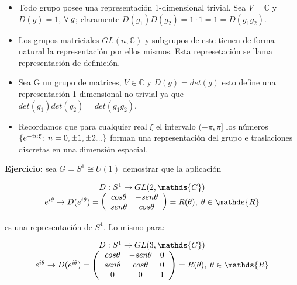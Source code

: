 \documentclass{article}
\begin{document}
\begin{itemize}
\item Todo grupo posee una representación 1-dimensional trivial. Sea $V=\mathds{C}$ y $D(g)=1$, $\forall \hspace{0.1cm} g$; claramente $D(g_1)D(g_2)=1\cdot 1=1=D(g_1g_2)$.
\item Los grupos matriciales $GL(n,\mathds{C})$ y subgrupos de este tienen de forma natural la representación por ellos mismos. Esta represetación se llama representación de definición.
\item Sea G un grupo de matrices, $V\in \mathds{C}$ y $D(g)=det(g)$ esto define una representación 1-dimensional no trivial ya que $det(g_1)det(g_2)=det(g_1g_2)$.
\item Recordamos que para cualquier real $\xi$ el intervalo $(-\pi, \pi]$ los números $\lbrace e^{-in\xi}; \hspace{0.1cm} n=0,\pm 1, \pm 2... \rbrace$ forman una representación del grupo e traslaciones discretas en una dimensión espacial.
\end{itemize}

\smallskip
\textbf{Ejercicio:} sea $G=S^1 \cong U(1)$ demostrar que la aplicación

$$\begin{array}{cc}
D: S^1 \to GL(2,\mathds{C})  \\
e^{i\theta} \to D(e^{i\theta})= \left (\begin{array}{cc}
cos \theta   & -sen \theta  \\
sen \theta   & cos \theta
\end{array} \right )=R( \theta), \hspace{0.1cm} \theta \in \mathds{R}
\end{array}$$

es una representación de $S^1$. Lo mismo para:

$$\begin{array}{cc}
D: S^1 \to GL(3,\mathds{C})  \\
e^{i\theta} \to D(e^{i\theta})= \left (\begin{array}{ccc}
cos \theta   & -sen \theta  & 0\\
sen \theta   & cos \theta & 0 \\
0 & 0 & 1
\end{array} \right )=R( \theta), \hspace{0.1cm} \theta \in \mathds{R}
\end{array}$$
\end{document}
